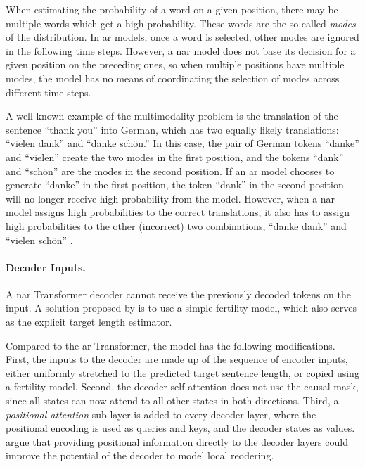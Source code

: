 When estimating the probability of a word on a given position, there may be
multiple words which get a high probability. These words are the so-called
\emph{modes} of the distribution. In \acl{ar} models, once a word is selected,
other modes are ignored in the following time steps. However, a \acl{nar} model
does not base its decision for a given position on the preceding ones, so when
multiple positions have multiple modes, the model has no means of coordinating
the selection of modes across different time steps.

A well-known example of the multimodality problem is the translation of the
sentence ``thank you'' into German, which has two equally likely translations:
``vielen dank'' and ``danke schön.'' In this case, the pair of German tokens
``danke'' and ``vielen'' create the two modes in the first position, and the
tokens ``dank'' and ``schön'' are the modes in the second position. If an
\acl{ar} model chooses to generate ``danke'' in the first position, the token
``dank'' in the second position will no longer receive high probability from
the model. However, when a \acl{nar} model assigns high probabilities to the
correct translations, it also has to assign high probabilities to the other
(incorrect) two combinations, ``danke dank'' and ``vielen schön''
\citep{gu2017nonautoregressive}.

\paragraph{Decoder Inputs.} A \acs{nar} Transformer decoder cannot
receive the previously decoded tokens on the input. A solution proposed by
\citet{gu2017nonautoregressive} is to use a simple fertility model, which also
serves as the explicit target length estimator.

Compared to the \acl{ar} Transformer, the model has the following
modifications. First, the inputs to the decoder are made up of the sequence of
encoder inputs, either uniformly stretched to the predicted target sentence
length, or copied using a fertility model. Second, the decoder self-attention
does not use the causal mask, since all states can now attend to all other
states in both directions. Third, a \emph{positional attention} sub-layer is
added to every decoder layer, where the positional encoding is used
as queries and keys, and the decoder states as
values. \citet{gu2017nonautoregressive} argue that providing positional
information directly to the decoder layers could improve the potential of the
decoder to model local reodering.

